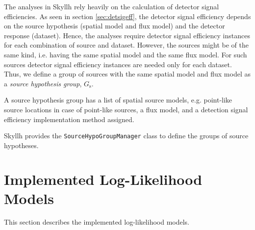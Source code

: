 \documentclass{article}
\newcommand{\code}[1]{\texttt{#1}}
\newcommand{\class}[1]{\colorbox{blue!30}{\code{#1}}}
\begin{document}
The analyses in Skyllh rely heavily on the calculation of detector signal
efficiencies. As seen in section \ref{sec:detsigeff}, the detector signal
efficiency depends on the source hypothesis (spatial model and flux model)
and the detector response (dataset). Hence, the analyses require detector signal
efficiency instances for each combination of source and dataset.
However, the sources might be of the same kind, i.e. having the same spatial
model and the same flux model. For such sources detector signal efficiency
instances are needed only for each dataset. Thus, we define a group
of sources with the same spatial model and flux model as a \emph{source hypothesis group},
$G_{\mathrm{s}}$.

A source hypothesis group has a list of spatial source models, e.g. point-like source
locations in case of point-like sources, a flux model, and a detection signal
efficiency implementation method assigned.

Skyllh provides the \class{SourceHypoGroupManager} class to define the groups of
source hypotheses.

\section{Implemented Log-Likelihood Models}
This section describes the implemented log-likelihood models. \cite{TimeDepPSSearchMethods2010}

%
%



\end{document}
